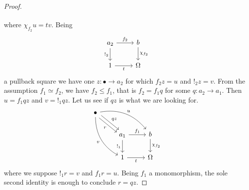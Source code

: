 \begin{proof}
\[\begin{tikzcd}
\end{tikzcd}\]
where \(\chi_{f_2} u = t v\). Being
\[\begin{tikzcd}
a_2 \ar["{!_2}", d, swap] \ar["{f_2}", r] & b \ar["{\chi_{f_2}}", d] \\
1 \ar["t", r, swap] & \Omega
\end{tikzcd}\]
a pullback square we have one \(z : \bullet \to a_2\) for which \(f_2 z = u\) and \(!_2 z = v\). From the assumption \(f_1 \simeq f_2\), we have \(f_2 \le f_1\), that is \(f_2 = f_1 q\) for some \(q : a_2 \to a_1\). Then \(u = f_1 q z\) and \(v = !_1 q z\). Let us see if \(qz\) is what we are looking for.
\[\begin{tikzcd}
\bullet \ar["u", drr, bend left] \ar["{qz}", dr, shift left] \ar["r", dr, swap, shift right] \ar["v", ddr, swap, bend right] \\
& a_1 \ar["{!_1}", d, swap] \ar["{f_1}", r] & b \ar["{\chi_{f_2}}", d] \\
& 1 \ar["t", r, swap] & \Omega
\end{tikzcd}\]
where we suppose \(!_1 r = v\) and \(f_1 r = u\). Being \(f_1\) a monomorphism, the sole second identity is enough to conclude \(r = qz\).
\end{proof}

